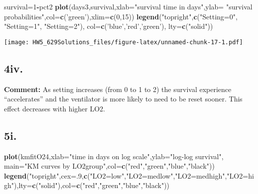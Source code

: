 \documentclass[]{article}
\newenvironment{Shaded}{\begin{snugshade}}{\end{snugshade}}
\newcommand{\DataTypeTok}[1]{\textcolor[rgb]{0.13,0.29,0.53}{#1}}
\newcommand{\DecValTok}[1]{\textcolor[rgb]{0.00,0.00,0.81}{#1}}
\newcommand{\KeywordTok}[1]{\textcolor[rgb]{0.13,0.29,0.53}{\textbf{#1}}}
\newcommand{\NormalTok}[1]{#1}
\newcommand{\OperatorTok}[1]{\textcolor[rgb]{0.81,0.36,0.00}{\textbf{#1}}}
\newcommand{\StringTok}[1]{\textcolor[rgb]{0.31,0.60,0.02}{#1}}
\begin{document}
\begin{Shaded}
\begin{Highlighting}[]
\NormalTok{survival=}\DecValTok{1}\OperatorTok{-}\NormalTok{pct2}
\KeywordTok{plot}\NormalTok{(days3,survival,}\DataTypeTok{xlab=}\StringTok{"survival time in days"}\NormalTok{,}\DataTypeTok{ylab=} \StringTok{"survival}
\StringTok{     probabilities"}\NormalTok{,}\DataTypeTok{col=}\KeywordTok{c}\NormalTok{(}\StringTok{'green'}\NormalTok{),}\DataTypeTok{xlim=}\KeywordTok{c}\NormalTok{(}\DecValTok{0}\NormalTok{,}\DecValTok{15}\NormalTok{))}
\KeywordTok{legend}\NormalTok{(}\StringTok{"topright"}\NormalTok{,}\KeywordTok{c}\NormalTok{(}\StringTok{"Setting=0"}\NormalTok{, }\StringTok{"Setting=1"}\NormalTok{, }\StringTok{"Setting=2"}\NormalTok{), }
\DataTypeTok{col=}\KeywordTok{c}\NormalTok{(}\StringTok{'blue'}\NormalTok{,}\StringTok{'red'}\NormalTok{,}\StringTok{'green'}\NormalTok{), }\DataTypeTok{lty=}\KeywordTok{c}\NormalTok{(}\StringTok{"solid"}\NormalTok{)) }
\end{Highlighting}
\end{Shaded}

\texttt{[image: HW5\_629Solutions\_files/figure-latex/unnamed-chunk-17-1.pdf]}

\hypertarget{iv.}{%
\subsection{4iv.}\label{iv.}}

\textbf{Comment:} As setting increases (from 0 to 1 to 2) the survival
experience ``accelerates'' and the ventilator is more likely to need to
be reset sooner. This effect decreases with higher LO2.

\hypertarget{i.-2}{%
\subsection{5i.}\label{i.-2}}

\begin{Shaded}
\begin{Highlighting}[]
\KeywordTok{plot}\NormalTok{(kmfitO24,}\DataTypeTok{xlab=}\StringTok{"time in days on log scale"}\NormalTok{,}\DataTypeTok{ylab=}\StringTok{"log-log survival"}\NormalTok{, }\DataTypeTok{main=}\StringTok{"KM curves by LO2group"}\NormalTok{,}\DataTypeTok{col=}\KeywordTok{c}\NormalTok{(}\StringTok{"red"}\NormalTok{,}\StringTok{"green"}\NormalTok{,}\StringTok{"blue"}\NormalTok{,}\StringTok{"black"}\NormalTok{))}
\KeywordTok{legend}\NormalTok{(}\StringTok{"topright"}\NormalTok{,}\DataTypeTok{cex=}\NormalTok{.}\DecValTok{9}\NormalTok{,}\KeywordTok{c}\NormalTok{(}\StringTok{"LO2=low"}\NormalTok{,}\StringTok{"LO2=medlow"}\NormalTok{,}\StringTok{"LO2=medhigh"}\NormalTok{,}\StringTok{"LO2=high"}\NormalTok{),}\DataTypeTok{lty=}\KeywordTok{c}\NormalTok{(}\StringTok{"solid"}\NormalTok{),}\DataTypeTok{col=}\KeywordTok{c}\NormalTok{(}\StringTok{"red"}\NormalTok{,}\StringTok{"green"}\NormalTok{,}\StringTok{"blue"}\NormalTok{,}\StringTok{"black"}\NormalTok{))}
\end{Highlighting}
\end{Shaded}
\end{document}
